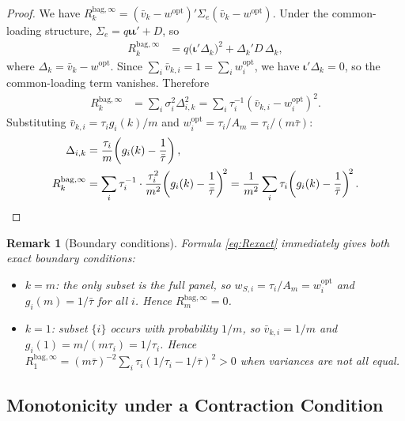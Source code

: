 \documentclass[12pt,a4paper]{article}
\newtheorem{remark}{Remark}
\theoremstyle{definition}
\newcommand{\Sig}{\Sigma_e}
\newcommand{\wopt}{w^{\mathrm{opt}}}
\newcommand{\Rk}{R_k^{\mathrm{bag},\infty}}
\newcommand{\vbar}{\bar{v}_k}
\begin{document}
\begin{proof}
We have $\Rk=(\vbar-\wopt)'\Sig(\vbar-\wopt)$.  Under the common-loading
structure, $\Sig=q\bm{\iota}\bm{\iota}'+D$, so
\begin{align*}
\Rk &= q\bigl(\bm{\iota}'\Delta_k\bigr)^2 + \Delta_k' D\,\Delta_k,
\end{align*}
where $\Delta_k=\vbar-\wopt$.  Since $\sum_i\bar v_{k,i}=1=\sum_i w_i^{\mathrm{opt}}$,
we have $\bm{\iota}'\Delta_k=0$, so the common-loading term vanishes.
Therefore
\begin{align*}
\Rk &= \sum_i\sigma_i^2\Delta_{i,k}^2
     = \sum_i\tau_i^{-1}\!\left(\bar v_{k,i}-w_i^{\mathrm{opt}}\right)^2.
\end{align*}
Substituting $\bar v_{k,i}=\tau_i g_i(k)/m$ and
$w_i^{\mathrm{opt}}=\tau_i/A_m=\tau_i/(m\bar\tau)$:
\begin{align*}
\Delta_{i,k} &= \frac{\tau_i}{m}\!\left(g_i(k)-\frac{1}{\bar\tau}\right),\\
\Rk &= \sum_i\tau_i^{-1}\cdot\frac{\tau_i^2}{m^2}\!\left(g_i(k)-\frac{1}{\bar\tau}\right)^{\!2}
    = \frac{1}{m^2}\sum_i\tau_i\!\left(g_i(k)-\frac{1}{\bar\tau}\right)^{\!2}.\qedhere
\end{align*}
\end{proof}

\begin{remark}[Boundary conditions]
Formula \eqref{eq:Rexact} immediately gives both exact boundary conditions:
\begin{itemize}[nosep]
  \item $k=m$: the only subset is the full panel, so $w_{S,i}=\tau_i/A_m=w_i^{\mathrm{opt}}$
    and $g_i(m)=1/\bar\tau$ for all $i$.  Hence $R_m^{\mathrm{bag},\infty}=0$. \checkmark
  \item $k=1$: subset $\{i\}$ occurs with probability $1/m$, so
    $\bar v_{k,i}=1/m$ and $g_i(1)=m/(m\tau_i)=1/\tau_i$.
    Hence $R_1^{\mathrm{bag},\infty}=(m\bar\tau)^{-2}\sum_i\tau_i(1/\tau_i-1/\bar\tau)^2>0$
    when variances are not all equal. \checkmark
\end{itemize}
\end{remark}

\subsection{Monotonicity under a Contraction Condition}
\end{document}
